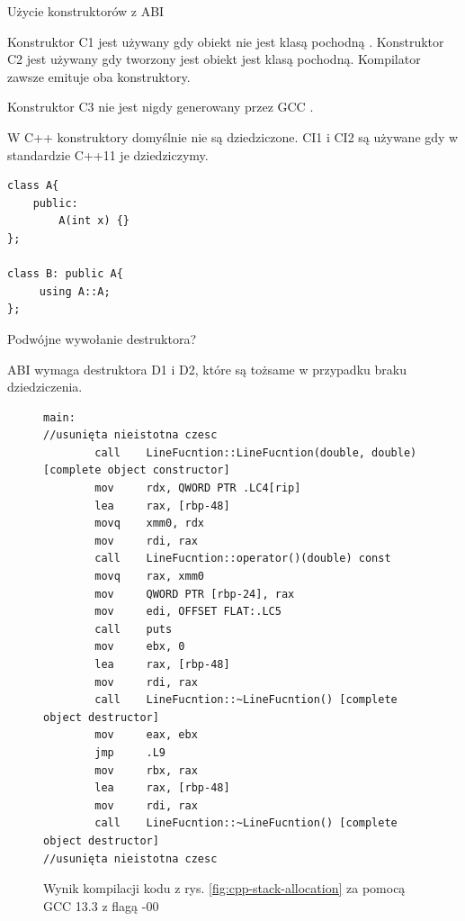 \documentclass[xcolor=table]{beamer}
\begin{document}
\begin{frame}[containsverbatim]{Użycie konstruktorów z ABI}
    \begin{block}{}
     Konstruktor C1 jest używany gdy obiekt nie jest klasą pochodną \cite{IBM-Two-identical-constructor}.
     Konstruktor C2 jest używany gdy tworzony jest obiekt jest klasą pochodną. Kompilator zawsze emituje oba konstruktory. 
    \end{block}
    
    \begin{block}{}
     Konstruktor C3 nie jest nigdy generowany przez GCC \cite{gcc-constructor}.
    \end{block}

\begin{block}{}
    W C++ konstruktory domyślnie nie są dziedziczone.
    CI1 i CI2 są używane gdy w standardzie C++11 je dziedziczymy.
    \tiny
    \begin{verbatim}
class A{
    public: 
        A(int x) {}
};

class B: public A{
     using A::A;
};
    \end{verbatim}
\end{block}

\end{frame}




\begin{frame}[containsverbatim]{Podwójne wywołanie destruktora?}
\tiny
\begin{block}{}
    ABI wymaga destruktora D1 i D2, które są tożsame w przypadku braku dziedziczenia.
\end{block}
    \begin{figure}
        \tiny
    \begin{verbatim}
main:
//usunięta nieistotna czesc
        call    LineFucntion::LineFucntion(double, double) [complete object constructor]
        mov     rdx, QWORD PTR .LC4[rip]
        lea     rax, [rbp-48]
        movq    xmm0, rdx
        mov     rdi, rax
        call    LineFucntion::operator()(double) const
        movq    rax, xmm0
        mov     QWORD PTR [rbp-24], rax
        mov     edi, OFFSET FLAT:.LC5
        call    puts
        mov     ebx, 0
        lea     rax, [rbp-48]
        mov     rdi, rax
        call    LineFucntion::~LineFucntion() [complete object destructor]
        mov     eax, ebx
        jmp     .L9
        mov     rbx, rax
        lea     rax, [rbp-48]
        mov     rdi, rax
        call    LineFucntion::~LineFucntion() [complete object destructor]
//usunięta nieistotna czesc 
        \end{verbatim}
                \label{fig:cpp-constructor-asm}
                \caption{Wynik kompilacji kodu z rys. \ref{fig:cpp-stack-allocation} za pomocą GCC 13.3 z flagą -00}
        \end{figure}
\end{frame}
\end{document}
